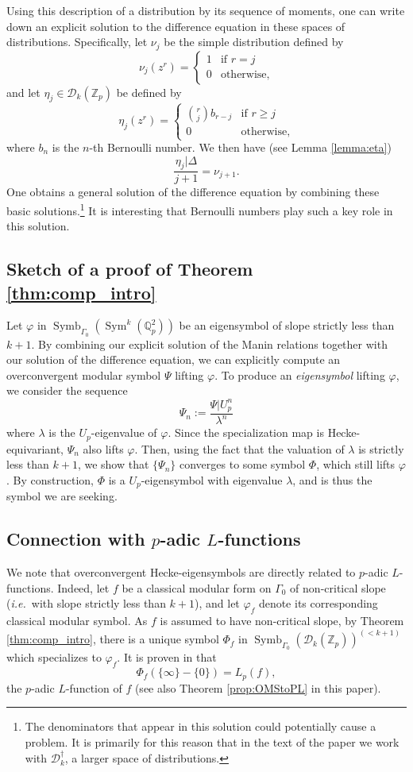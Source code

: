 \documentclass{amsart}
\theoremstyle{plain}
\theoremstyle{definition}
\newcommand{\D}{{\mathcal D}}
\newcommand{\Z}{{\mathbb Z}}
\newcommand{\Q}{{\mathbb Q}}
\newcommand{\Zp}{\Z_p}
\newcommand{\Qp}{\Q_p}
\renewcommand{\binom}[2]{\genfrac{(}{)}{0pt}{}{#1}{#2}}
\newcommand{\Dkoc}{\D_k^\dag}
\newcommand{\Dvla}[1]{\D_{#1}(\Zp)}
\newcommand{\Dkla}{\Dvla{k}}
\DeclareMathOperator{\Symb}{Symb}
\DeclareMathOperator{\Sym}{Sym}
\newcommand{\MSo}[1]{\Symb_{\Gamma_0}(#1)}
\begin{document}
Using this description of a distribution by its sequence of moments, one can write down an explicit solution to the difference equation in these spaces of distributions.  Specifically, let $\nu_j$ be the simple distribution defined by
$$
\nu_j(z^r)  =  \begin{cases} 1 & \text{if~} r=j \\ 0 & \text{otherwise}, \end{cases}
$$
and let $\eta_j \in \Dkla$ be defined by
$$
\eta_j(z^r)  =  \begin{cases} \binom{r}{j} b_{r-j} & \text{if~} r \geq j \\ 0 & \text{otherwise}, \end{cases}
$$
where $b_n$ is the $n$-th Bernoulli number.
We then have (see Lemma \ref{lemma:eta})
$$
\frac{\eta_j \big| \Delta}{j+1}  = \nu_{j+1}.
$$
One obtains a general solution of the difference equation by combining these basic solutions.\footnote{The denominators that appear in this solution could potentially cause a problem.  It is primarily for this reason that in the text of the paper we work with $\Dkoc$, a larger space of distributions.} It is interesting that Bernoulli numbers play such a key role in this solution.

\subsection{Sketch of a proof of Theorem \ref{thm:comp_intro}}

Let $\varphi$ in $\MSo{\Sym^k(\Qp^2)}$ be an eigensymbol of slope strictly less than $k+1$.  By combining our explicit solution of the Manin relations together with our solution of the difference equation, we can explicitly compute an overconvergent modular symbol $\Psi$ lifting $\varphi$. To produce an {\it eigensymbol} lifting $\varphi$, we consider the sequence
$$
\Psi_n := \frac{\Psi \big| U_p^n}{\lambda^n} 
$$ 
where $\lambda$ is the $U_p$-eigenvalue of $\varphi$.  Since the specialization map is Hecke-equivariant, $\Psi_n$ also lifts $\varphi$.  Then, using the fact that the valuation of $\lambda$ is strictly less than $k+1$, we show that $\{ \Psi_n \}$ converges to some symbol $\Phi$, which still lifts $\varphi$.  By construction, $\Phi$ is a $U_p$-eigensymbol with eigenvalue $\lambda$, and is thus the symbol we are seeking. 


\subsection{Connection with $p$-adic $L$-functions}
We note that overconvergent Hecke-eigensymbols are directly related to  $p$-adic $L$-functions.  Indeed, let $f$ be a classical modular form on $\Gamma_0$ of non-critical slope ({\it i.e.}\ with slope strictly less than $k+1$), and let $\varphi_f$ denote its corresponding classical modular symbol.  As $f$ is assumed to have non-critical slope, by Theorem \ref{thm:comp_intro}, there is a unique symbol $\Phi_f$ in $\MSo{\Dkla}^{(<k+1)}$ which specializes to $\varphi_f$.   It is proven in \cite{Stevens} that 
$$
\Phi_f\left( \{ \infty \} - \{0\}\right) = L_p(f),
$$
the $p$-adic $L$-function of $f$ (see also Theorem \ref{prop:OMStoPL} in this paper).  
\end{document}
